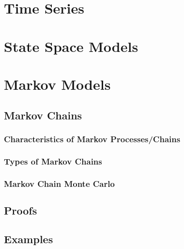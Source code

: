 \newpage
\section*{Time Series}\label{sec:time_series}
  \section{State Space Models}\label{sec:markov_chains}
    
  \section{Markov Models}\label{sec:markov_chains}
    
    \subsection{Markov Chains}\label{subsec:markov_chains}
      
    \subsubsection{Characteristics of Markov Processes/Chains}\label{subsubsec:name}
      
    \subsubsection{Types of Markov Chains}\label{subsubsec:types_of_markov_chains}
      
      \subsubsection{Markov Chain Monte Carlo }\label{subsec:markov_chain_monte_carlo_mcmc}
      
      \subsection{Proofs}\label{subsec:proofs}
      
      \subsection{Examples}\label{subsec:examples}
      
